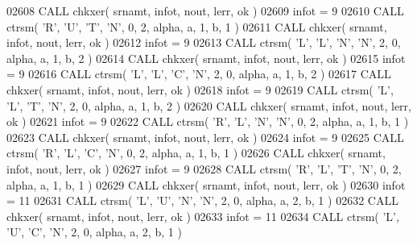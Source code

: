 \begin{DoxyCode}
02608       \textcolor{keyword}{CALL }chkxer( srnamt, infot, nout, lerr, ok )
02609       infot = 9
02610       \textcolor{keyword}{CALL }ctrsm( \textcolor{stringliteral}{'R'}, \textcolor{stringliteral}{'U'}, \textcolor{stringliteral}{'T'}, \textcolor{stringliteral}{'N'}, 0, 2, alpha, a, 1, b, 1 )
02611       \textcolor{keyword}{CALL }chkxer( srnamt, infot, nout, lerr, ok )
02612       infot = 9
02613       \textcolor{keyword}{CALL }ctrsm( \textcolor{stringliteral}{'L'}, \textcolor{stringliteral}{'L'}, \textcolor{stringliteral}{'N'}, \textcolor{stringliteral}{'N'}, 2, 0, alpha, a, 1, b, 2 )
02614       \textcolor{keyword}{CALL }chkxer( srnamt, infot, nout, lerr, ok )
02615       infot = 9
02616       \textcolor{keyword}{CALL }ctrsm( \textcolor{stringliteral}{'L'}, \textcolor{stringliteral}{'L'}, \textcolor{stringliteral}{'C'}, \textcolor{stringliteral}{'N'}, 2, 0, alpha, a, 1, b, 2 )
02617       \textcolor{keyword}{CALL }chkxer( srnamt, infot, nout, lerr, ok )
02618       infot = 9
02619       \textcolor{keyword}{CALL }ctrsm( \textcolor{stringliteral}{'L'}, \textcolor{stringliteral}{'L'}, \textcolor{stringliteral}{'T'}, \textcolor{stringliteral}{'N'}, 2, 0, alpha, a, 1, b, 2 )
02620       \textcolor{keyword}{CALL }chkxer( srnamt, infot, nout, lerr, ok )
02621       infot = 9
02622       \textcolor{keyword}{CALL }ctrsm( \textcolor{stringliteral}{'R'}, \textcolor{stringliteral}{'L'}, \textcolor{stringliteral}{'N'}, \textcolor{stringliteral}{'N'}, 0, 2, alpha, a, 1, b, 1 )
02623       \textcolor{keyword}{CALL }chkxer( srnamt, infot, nout, lerr, ok )
02624       infot = 9
02625       \textcolor{keyword}{CALL }ctrsm( \textcolor{stringliteral}{'R'}, \textcolor{stringliteral}{'L'}, \textcolor{stringliteral}{'C'}, \textcolor{stringliteral}{'N'}, 0, 2, alpha, a, 1, b, 1 )
02626       \textcolor{keyword}{CALL }chkxer( srnamt, infot, nout, lerr, ok )
02627       infot = 9
02628       \textcolor{keyword}{CALL }ctrsm( \textcolor{stringliteral}{'R'}, \textcolor{stringliteral}{'L'}, \textcolor{stringliteral}{'T'}, \textcolor{stringliteral}{'N'}, 0, 2, alpha, a, 1, b, 1 )
02629       \textcolor{keyword}{CALL }chkxer( srnamt, infot, nout, lerr, ok )
02630       infot = 11
02631       \textcolor{keyword}{CALL }ctrsm( \textcolor{stringliteral}{'L'}, \textcolor{stringliteral}{'U'}, \textcolor{stringliteral}{'N'}, \textcolor{stringliteral}{'N'}, 2, 0, alpha, a, 2, b, 1 )
02632       \textcolor{keyword}{CALL }chkxer( srnamt, infot, nout, lerr, ok )
02633       infot = 11
02634       \textcolor{keyword}{CALL }ctrsm( \textcolor{stringliteral}{'L'}, \textcolor{stringliteral}{'U'}, \textcolor{stringliteral}{'C'}, \textcolor{stringliteral}{'N'}, 2, 0, alpha, a, 2, b, 1 )

\end{DoxyCode}
